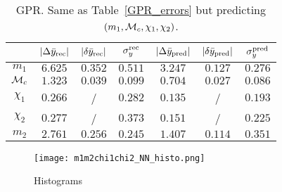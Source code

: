 \begin{table}
  \caption{\label{GPR_errors_temp} GPR. Same as Table~\ref{GPR_errors} but predicting $(m_1, {\cal{M}}_c, \chi_1, \chi_2)$. }
  \begin{center}
  \begin{tabular}{c|ccc|ccc}
  \hline\hline
  & $|\Delta \bar{y}_{\rm rec}|$  & $|\delta \bar{y}_{\rm rec}|$  & $\sigma_y^{\rm rec}$ & 
     $|\Delta \bar{y}_{\rm pred}|$ & $|\delta \bar{y}_{\rm pred}|$ & $\sigma_y^{\rm pred}$ \\
  \hline\hline
$m_1$          & $6.625$ & $0.352$ & $0.511$ & $3.247$ & $0.127$ & $0.276$ \\
${\cal{M}}_c$  & $1.323$ & $0.039$ & $0.099$ & $0.704$ & $0.027$ & $0.086$ \\
$\chi_1$       & $0.266$ &  /  & $0.282$ & $0.135$ &  /  & $0.193$ \\
$\chi_2$       & $0.277$ &  /  & $0.373$ & $0.151$ &  /  & $0.225$ \\
\hline
$m_2$          & $2.761$ & $0.256$ & $0.245$ & $1.407$ & $0.114$ & $0.351$ \\
  \hline\hline
  \end{tabular}
  \end{center}
\end{table}



\begin{figure}
    \centering
    \texttt{[image: m1m2chi1chi2\_NN\_histo.png]}
    \caption{Histograms}
        \label{m1m2chi1chi2_NN_histo}
\end{figure}

